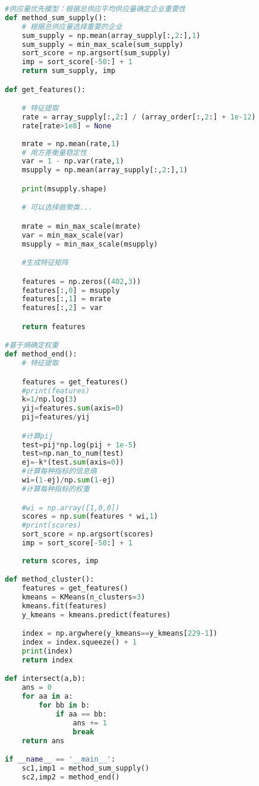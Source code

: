 \documentclass{my_paper}
\begin{document}
\begin{itemize}
\begin{lstlisting}[language={Python}]
#供应量优先模型：根据总供应平均供应量确定企业重要性
def method_sum_supply():
    # 根据总供应量选择重要的企业
    sum_supply = np.mean(array_supply[:,2:],1)
    sum_supply = min_max_scale(sum_supply)
    sort_score = np.argsort(sum_supply)
    imp = sort_score[-50:] + 1
    return sum_supply, imp

def get_features():

    # 特征提取
    rate = array_supply[:,2:] / (array_order[:,2:] + 1e-12)
    rate[rate>1e8] = None
    
    mrate = np.mean(rate,1)
    # 用方差衡量稳定性
    var = 1 - np.var(rate,1)
    msupply = np.mean(array_supply[:,2:],1)

    print(msupply.shape)

    # 可以选择做聚类... 

    mrate = min_max_scale(mrate)
    var = min_max_scale(var)
    msupply = min_max_scale(msupply)

    #生成特征矩阵

    features = np.zeros((402,3))
    features[:,0] = msupply
    features[:,1] = mrate
    features[:,2] = var 

    return features

#基于熵确定权重
def method_end():
    # 特征提取

    features = get_features()
    #print(features)
    k=1/np.log(3)
    yij=features.sum(axis=0)
    pij=features/yij

    #计算pij
    test=pij*np.log(pij + 1e-5)
    test=np.nan_to_num(test)
    ej=-k*(test.sum(axis=0))
    #计算每种指标的信息熵
    wi=(1-ej)/np.sum(1-ej)
    #计算每种指标的权重

    #wi = np.array([1,0,0])
    scores = np.sum(features * wi,1)
    #print(scores)
    sort_score = np.argsort(scores)
    imp = sort_score[-50:] + 1
    
    return scores, imp

def method_cluster():
    features = get_features()
    kmeans = KMeans(n_clusters=3)
    kmeans.fit(features)
    y_kmeans = kmeans.predict(features)

    index = np.argwhere(y_kmeans==y_kmeans[229-1])
    index = index.squeeze() + 1
    print(index)
    return index 

def intersect(a,b):
    ans = 0
    for aa in a:
        for bb in b:
            if aa == bb:
                ans += 1
                break
    return ans 

if __name__ == '__main__':
    sc1,imp1 = method_sum_supply()
    sc2,imp2 = method_end()


\end{lstlisting}
\end{itemize}
\end{document}
